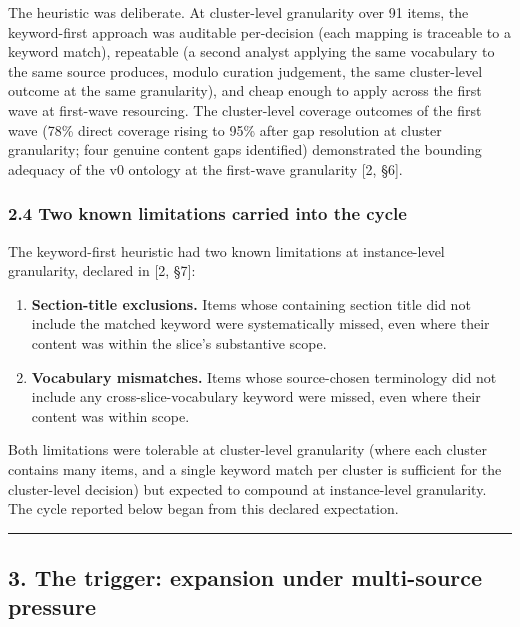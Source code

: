 \documentclass[
]{article}
\providecommand{\tightlist}{%
  \setlength{\itemsep}{0pt}\setlength{\parskip}{0pt}}
\begin{document}
The heuristic was deliberate. At cluster-level granularity over 91
items, the keyword-first approach was auditable per-decision (each
mapping is traceable to a keyword match), repeatable (a second analyst
applying the same vocabulary to the same source produces, modulo
curation judgement, the same cluster-level outcome at the same
granularity), and cheap enough to apply across the first wave at
first-wave resourcing. The cluster-level coverage outcomes of the first
wave (78\% direct coverage rising to 95\% after gap resolution at
cluster granularity; four genuine content gaps identified) demonstrated
the bounding adequacy of the v0 ontology at the first-wave granularity
{[}2, §6{]}.

\subsubsection{2.4 Two known limitations carried into the
cycle}\label{two-known-limitations-carried-into-the-cycle}

The keyword-first heuristic had two known limitations at instance-level
granularity, declared in {[}2, §7{]}:

\begin{enumerate}
\def\labelenumi{\arabic{enumi}.}
\tightlist
\item
  \textbf{Section-title exclusions.} Items whose containing section
  title did not include the matched keyword were systematically missed,
  even where their content was within the slice's substantive scope.
\item
  \textbf{Vocabulary mismatches.} Items whose source-chosen terminology
  did not include any cross-slice-vocabulary keyword were missed, even
  where their content was within scope.
\end{enumerate}

Both limitations were tolerable at cluster-level granularity (where each
cluster contains many items, and a single keyword match per cluster is
sufficient for the cluster-level decision) but expected to compound at
instance-level granularity. The cycle reported below began from this
declared expectation.

\begin{center}\rule{0.5\linewidth}{0.5pt}\end{center}

\subsection{3. The trigger: expansion under multi-source
pressure}\label{the-trigger-expansion-under-multi-source-pressure}
\end{document}
